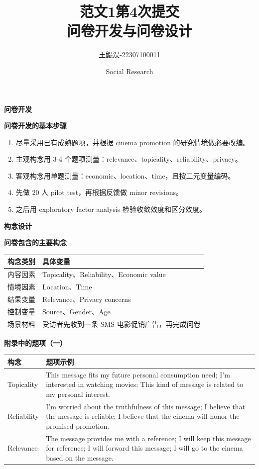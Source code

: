 \documentclass[aspectratio=169,UTF8,zihao=-4]{ctexbeamer}
\title{范文1第4次提交\\问卷开发与问卷设计}
\author{王鲲淏-22307100011}
\date{Social Research}
\newcommand{\bigidea}[1]{
  \begin{center}
    \vspace{0.8em}
    {\LARGE \bfseries #1}
    \vspace{0.6em}
  \end{center}
}
\newcommand{\sectionpageframe}[1]{
  \begin{frame}[plain]
    \begin{center}
      \vfill
      {\Huge \bfseries #1}
      \vfill
    \end{center}
  \end{frame}
}
\begin{document}
\begin{frame}[plain]
  \titlepage
\end{frame}

\sectionpageframe{问卷开发}

\begin{frame}
  \bigidea{问卷开发的基本步骤}
  \begin{enumerate}
    \item \Large 尽量采用已有成熟题项，并根据 cinema promotion 的研究情境做必要改编。
    \item \Large 主观构念用 3-4 个题项测量：relevance、topicality、reliability、privacy。
    \item \Large 客观构念用单题测量：economic、location、time，且按二元变量编码。
    \item \Large 先做 20 人 pilot test，再根据反馈做 minor revisions。
    \item \Large 之后用 exploratory factor analysis 检验收敛效度和区分效度。
  \end{enumerate}
\end{frame}

\sectionpageframe{构念设计}

\begin{frame}
  \bigidea{问卷包含的主要构念}
  \small
  \begin{tabular}{p{3.0cm}p{7.0cm}}
    \toprule
    构念类别 & 具体变量 \\
    \midrule
    内容因素 & Topicality、Reliability、Economic value \\
    情境因素 & Location、Time \\
    结果变量 & Relevance、Privacy concerns \\
    控制变量 & Source、Gender、Age \\
    场景材料 & 受访者先收到一条 SMS 电影促销广告，再完成问卷 \\
    \bottomrule
  \end{tabular}
\end{frame}

\begin{frame}
  \bigidea{附录中的题项（一）}
  \scriptsize
  \begin{tabular}{p{2.2cm}p{7.6cm}}
    \toprule
    构念 & 题项示例 \\
    \midrule
    Topicality & This message fits my future personal consumption need; I'm interested in watching movies; This kind of message is related to my personal interest. \\
    Reliability & I'm worried about the truthfulness of this message; I believe that the message is reliable; I believe that the cinema will honor the promised promotion. \\
    Relevance & The message provides me with a reference; I will keep this message for reference; I will forward this message; I will go to the cinema based on the message. \\
    \bottomrule
  \end{tabular}
\end{frame}
\end{document}

